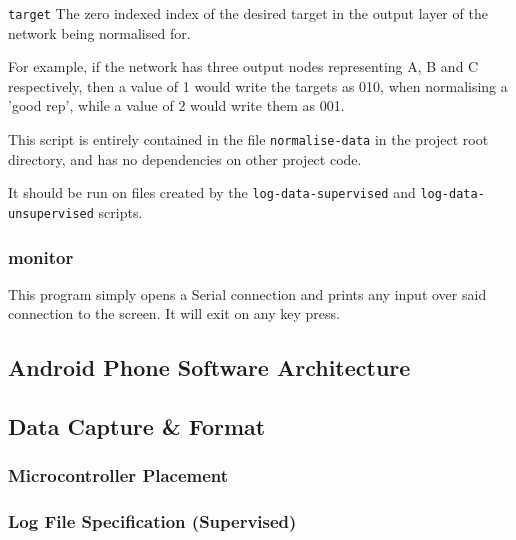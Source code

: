 \documentclass[a4paper]{article}
\begin{document}
\lstinline{target} The zero indexed index of the desired target in the output layer of the network being normalised for. 

For example, if the network has three output nodes representing A, B and C respectively, then a value of 1 would write the targets as 010, when normalising a 'good rep', while a value of 2 would write them as 001.

This script is entirely contained in the file \lstinline{normalise-data} in the project root directory, and has no dependencies on other project code.

It should be run on files created by the \lstinline{log-data-supervised} and \lstinline{log-data-unsupervised} scripts.

\subsubsection{monitor}

This program simply opens a Serial connection and prints any input over said connection to the screen. It will exit on any key press.

\subsection{Android Phone Software Architecture}%


\subsection{Data Capture \& Format}%


\subsubsection{Microcontroller Placement}


\subsubsection{Log File Specification (Supervised)}
\end{document}
